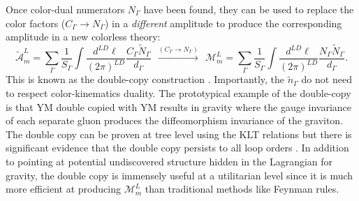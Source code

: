 \documentclass[11pt,letter]{article}
\def\be{\begin{equation}}
\begin{document}
Once color-dual numerators $N_\Gamma$ have been found, they can be
used to replace the color factors ($C_\Gamma \to N_\Gamma$) in a
\emph{different} amplitude to produce the corresponding amplitude in
a new colorless theory: \be\label{DCconstruction}
\tilde{\mathcal{A}}_m^L = \sum \limits_\Gamma \frac{1}{S_\Gamma} \int
\frac{d^{LD}\ell}{(2\pi)^{LD}} \frac{C_\Gamma
  \tilde{N}_\Gamma}{d_\Gamma} ~~ \xrightarrow{(C_\Gamma \to N_\Gamma)}
~~ \mathcal{M}_m^L = \sum \limits_\Gamma \frac{1}{S_\Gamma} \int
\frac{d^{LD}\ell}{(2\pi)^{LD}} \frac{N_\Gamma
  \tilde{N}_\Gamma}{d_\Gamma}.
\end{equation}
This is known as the double-copy construction \cite{BCJ,Bern:2010ue,BCJreview}.
Importantly, the $\tilde{n}_\Gamma$ do not need to respect
color-kinematics duality.  The prototypical example of the double-copy
is that YM double copied with YM results in gravity where the gauge
invariance of each separate gluon produces the diffeomorphism
invariance of the graviton.  The double copy can be proven at tree
level using the KLT relations but there is significant evidence that
the double copy persists to all loop orders \cite{FiveLoopN4,
  GeneralizedDoubleCopyFiveLoops, Bern:2018jmv, Carrasco:2021otn, KLT,
  KiermaierTalk}.  In addition to pointing at potential undiscovered
structure hidden in the Lagrangian for gravity, the double copy is
immensely useful at a utilitarian level since it is much more
efficient at producing $\mathcal{M}_m^L$ than traditional methods like
Feynman rules.
\end{document}
